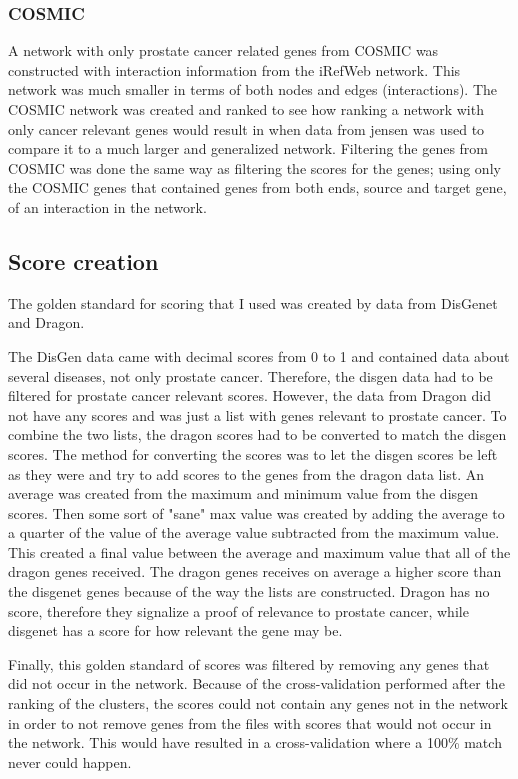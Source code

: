 \subsubsection{COSMIC}
A network with only prostate cancer related genes from
COSMIC\cite{cosmic-download} was constructed with interaction information from
the iRefWeb network. This network was much smaller in terms of both nodes and
edges (interactions). The COSMIC network was created and ranked to see how
ranking a network with only cancer relevant genes would result in when data from
jensen was used to compare it to a much larger and generalized network.
Filtering the genes from COSMIC was done the same way as filtering the scores
for the genes; using only the COSMIC genes that contained genes from both ends,
source and target gene, of an interaction in the network.

\subsection{Score creation}
The golden standard for scoring that I used was created by data from
DisGenet\cite{disgenet} and Dragon\cite{dragon}.

The DisGen data came with decimal scores from 0 to 1 and contained data about
several diseases, not only prostate cancer. Therefore, the disgen data had to be
filtered for prostate cancer relevant scores. However, the data from Dragon did
not have any scores and was just a list with genes relevant to prostate cancer.
To combine the two lists, the dragon scores had to be converted to match the
disgen scores. The method for converting the scores was to let the disgen scores
be left as they were and try to add scores to the genes from the dragon data
list. An average was created from the maximum and minimum value from the disgen
scores. Then some sort of "sane" max value was created by adding the average to
a quarter of the value of the average value subtracted from the maximum value.
This created a final value between the average and maximum value that all of the
dragon genes received. The dragon genes receives on average a higher score than
the disgenet genes because of the way the lists are constructed. Dragon has no
score, therefore they signalize a proof of relevance to prostate cancer, while
disgenet has a score for how relevant the gene may be.

Finally, this golden standard of scores was filtered by removing any genes that
did not occur in the network. Because of the cross-validation performed after
the ranking of the clusters, the scores could not contain any genes not in the
network in order to not remove genes from the files with scores that would not
occur in the network. This would have resulted in a cross-validation where
a 100\% match never could happen.

